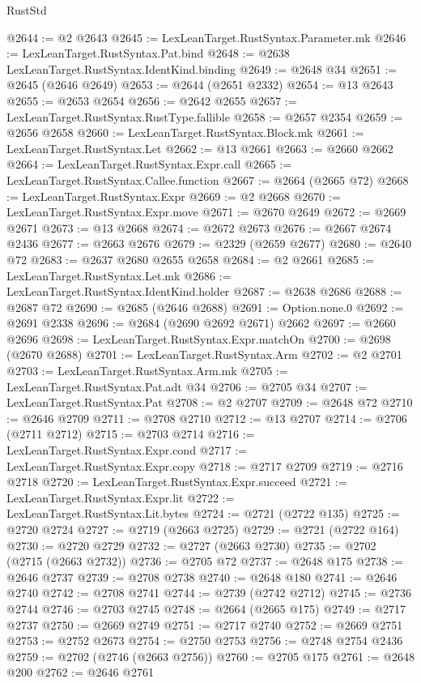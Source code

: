\begin{lexlean}{RustStd}
\begin{coremodule}
@2644 := @2 @2643
@2645 := LexLeanTarget.RustSyntax.Parameter.mk
@2646 := LexLeanTarget.RustSyntax.Pat.bind
@2648 := @2638 LexLeanTarget.RustSyntax.IdentKind.binding
@2649 := @2648 @34
@2651 := @2645 (@2646 @2649)
@2653 := @2644 (@2651 @2332)
@2654 := @13 @2643
@2655 := @2653 @2654
@2656 := @2642 @2655
@2657 := LexLeanTarget.RustSyntax.RustType.fallible
@2658 := @2657 @2354
@2659 := @2656 @2658
@2660 := LexLeanTarget.RustSyntax.Block.mk
@2661 := LexLeanTarget.RustSyntax.Let
@2662 := @13 @2661
@2663 := @2660 @2662
@2664 := LexLeanTarget.RustSyntax.Expr.call
@2665 := LexLeanTarget.RustSyntax.Callee.function
@2667 := @2664 (@2665 @72)
@2668 := LexLeanTarget.RustSyntax.Expr
@2669 := @2 @2668
@2670 := LexLeanTarget.RustSyntax.Expr.move
@2671 := @2670 @2649
@2672 := @2669 @2671
@2673 := @13 @2668
@2674 := @2672 @2673
@2676 := @2667 @2674 @2436
@2677 := @2663 @2676
@2679 := @2329 (@2659 @2677)
@2680 := @2640 @72
@2683 := @2637 @2680 @2655 @2658
@2684 := @2 @2661
@2685 := LexLeanTarget.RustSyntax.Let.mk
@2686 := LexLeanTarget.RustSyntax.IdentKind.holder
@2687 := @2638 @2686
@2688 := @2687 @72
@2690 := @2685 (@2646 @2688)
@2691 := Option.none.{0}
@2692 := @2691 @2338
@2696 := @2684 (@2690 @2692 @2671) @2662
@2697 := @2660 @2696
@2698 := LexLeanTarget.RustSyntax.Expr.matchOn
@2700 := @2698 (@2670 @2688)
@2701 := LexLeanTarget.RustSyntax.Arm
@2702 := @2 @2701
@2703 := LexLeanTarget.RustSyntax.Arm.mk
@2705 := LexLeanTarget.RustSyntax.Pat.adt @34
@2706 := @2705 @34
@2707 := LexLeanTarget.RustSyntax.Pat
@2708 := @2 @2707
@2709 := @2648 @72
@2710 := @2646 @2709
@2711 := @2708 @2710
@2712 := @13 @2707
@2714 := @2706 (@2711 @2712)
@2715 := @2703 @2714
@2716 := LexLeanTarget.RustSyntax.Expr.cond
@2717 := LexLeanTarget.RustSyntax.Expr.copy
@2718 := @2717 @2709
@2719 := @2716 @2718
@2720 := LexLeanTarget.RustSyntax.Expr.succeed
@2721 := LexLeanTarget.RustSyntax.Expr.lit
@2722 := LexLeanTarget.RustSyntax.Lit.bytes
@2724 := @2721 (@2722 @135)
@2725 := @2720 @2724
@2727 := @2719 (@2663 @2725)
@2729 := @2721 (@2722 @164)
@2730 := @2720 @2729
@2732 := @2727 (@2663 @2730)
@2735 := @2702 (@2715 (@2663 @2732))
@2736 := @2705 @72
@2737 := @2648 @175
@2738 := @2646 @2737
@2739 := @2708 @2738
@2740 := @2648 @180
@2741 := @2646 @2740
@2742 := @2708 @2741
@2744 := @2739 (@2742 @2712)
@2745 := @2736 @2744
@2746 := @2703 @2745
@2748 := @2664 (@2665 @175)
@2749 := @2717 @2737
@2750 := @2669 @2749
@2751 := @2717 @2740
@2752 := @2669 @2751
@2753 := @2752 @2673
@2754 := @2750 @2753
@2756 := @2748 @2754 @2436
@2759 := @2702 (@2746 (@2663 @2756))
@2760 := @2705 @175
@2761 := @2648 @200
@2762 := @2646 @2761

\end{coremodule}
\end{lexlean}
